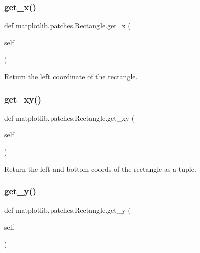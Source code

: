 \subsubsection{\texorpdfstring{get\+\_\+x()}{get\_x()}}
{\footnotesize\ttfamily def matplotlib.\+patches.\+Rectangle.\+get\+\_\+x (\begin{DoxyParamCaption}\item[{}]{self }\end{DoxyParamCaption})}

\begin{DoxyVerb}Return the left coordinate of the rectangle.\end{DoxyVerb}
 \mbox{\label{classmatplotlib_1_1patches_1_1Rectangle_a4b017693949cd5ea9f162f168f8e0855}} 
\subsubsection{\texorpdfstring{get\+\_\+xy()}{get\_xy()}}
{\footnotesize\ttfamily def matplotlib.\+patches.\+Rectangle.\+get\+\_\+xy (\begin{DoxyParamCaption}\item[{}]{self }\end{DoxyParamCaption})}

\begin{DoxyVerb}Return the left and bottom coords of the rectangle as a tuple.\end{DoxyVerb}
 \mbox{\label{classmatplotlib_1_1patches_1_1Rectangle_a3678a7dc4fccc2fbd67eec412a8bd531}} 
\subsubsection{\texorpdfstring{get\+\_\+y()}{get\_y()}}
{\footnotesize\ttfamily def matplotlib.\+patches.\+Rectangle.\+get\+\_\+y (\begin{DoxyParamCaption}\item[{}]{self }\end{DoxyParamCaption})}

